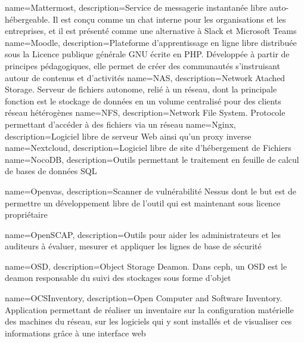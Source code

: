 {
    name=Mattermost,
    description={Service de messagerie instantanée libre auto-hébergeable. Il est conçu comme un chat interne pour les organisations et les entreprises, et il est présenté comme une alternative à Slack et Microsoft Teams}
}
{
    name=Moodle,
    description={Plateforme d'apprentissage en ligne libre distribuée sous la Licence publique générale GNU écrite en PHP. Développée à partir de principes pédagogiques, elle permet de créer des communautés s'instruisant autour de contenus et d'activités}
}
{
    name=NAS,
    description={Network Atached Storage. Serveur de fichiers autonome, relié à un réseau, dont la principale fonction est le stockage de données en un volume centralisé pour des clients réseau hétérogènes}
}
{
    name=NFS,
    description={Network File System. Protocole permettant d'accéder à des fichiers via un réseau}
}
{
    name=Nginx,
    description={Logiciel libre de serveur Web ainsi qu'un proxy inverse}
}
{
    name=Nextcloud,
    description={Logiciel libre de site d'hébergement de Fichiers}
}
{
    name=NocoDB,
    description={Outils permettant le traitement en feuille de calcul de bases de données SQL}
}

{
    name=Openvas,
    description={Scanner de vulnérabilité Nessus dont le but est de permettre un développement libre de l’outil qui est maintenant sous licence propriétaire}
}

{
    name=OpenSCAP,
    description={Outils pour aider les administrateurs et les auditeurs à évaluer, mesurer et appliquer les lignes de base de sécurité}
}

{
    name=OSD,
    description={Object Storage Deamon. Dans ceph, un OSD est le deamon responsable du suivi des stockages sous forme d'objet}
}

{
    name=OCSInventory,
    description={Open Computer and Software Inventory. Application permettant de réaliser un inventaire sur la configuration matérielle des machines du réseau, sur les logiciels qui y sont installés et de visualiser ces informations grâce à une interface web}
}

